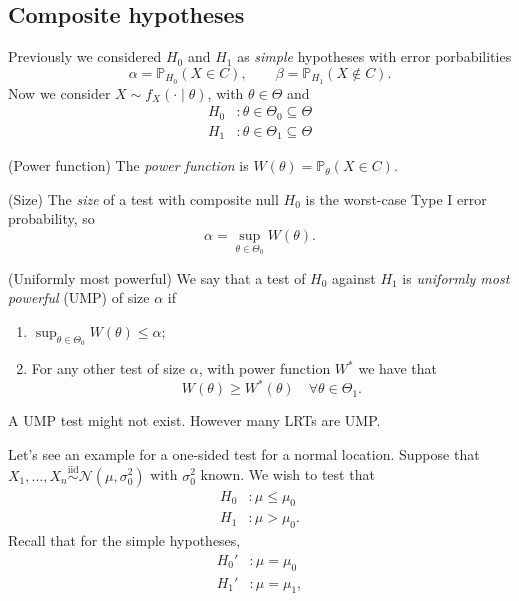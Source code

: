 \documentclass{article}
\newcommand{\iid}{\overset{\text{iid}}{\sim}}
\begin{document}
\subsection{Composite hypotheses}
Previously we considered $ H_0 $ and $ H_1 $ as \textit{simple} hypotheses with error porbabilities
\[
\alpha = \mathbb P_{H_0}(X\in C), \qquad \beta = \mathbb P_{H_1}(X\notin C).
\]
Now we consider $ X\sim f_X(\cdot \mid \theta) $, with $ \theta\in\Theta $ and
\begin{align*}
	H_0 &: \theta\in\Theta_0 \subseteq \Theta\\
	H_1 &: \theta\in\Theta_1 \subseteq \Theta
\end{align*}
\begin{definition}
	(Power function) The \textit{power function} is $ W(\theta)= \mathbb P_\theta(X\in C) $.
\end{definition}
\begin{definition}
	(Size) The \textit{size} of a test with composite null $ H_0 $ is the worst-case Type I error probability, so
	\[
		\alpha = \sup_{\theta\in \Theta_0} W(\theta).
	\]
\end{definition}
\begin{definition}
	(Uniformly most powerful) We say that a test of $ H_0 $ against $ H_1 $ is \textit{uniformly most powerful} (UMP) of size $ \alpha $ if
	\begin{enumerate}
		\item $ \sup_{\theta\in\Theta_0} W(\theta)\le \alpha $;
		\item For any other test of size $ \alpha $, with power function $ W^* $ we have that
			\[
			  W(\theta) \ge W^*(\theta)\quad \forall\theta\in \Theta_1.
			\]
	\end{enumerate}
\end{definition}
\begin{remark}
  A UMP test might not exist. However many LRTs are UMP.
\end{remark}
Let's see an example for a one-sided test for a normal location. Suppose that $ X_1,\dots,X_n \iid \mathcal N(\mu,\sigma_0^2) $ with $ \sigma_0^2 $ known. We wish to test that
\begin{align*}
	H_0&: \mu \le \mu_0 \\
	H_1&: \mu > \mu_0.
\end{align*}
Recall that for the simple hypotheses,
\begin{align*}
	H_0'&: \mu = \mu_0 \\
	H_1'&: \mu = \mu_1,
\end{align*}
\end{document}
